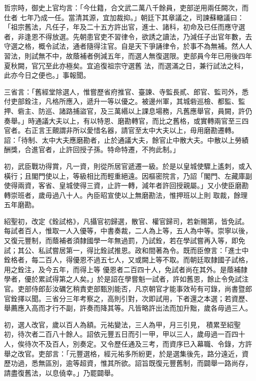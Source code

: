 \begin{pinyinscope}
 哲宗時，御史上官均言：「今仕籍，合文武二萬八千餘員，吏部逆用兩任闕次，而仕者
 七年乃成一任。當清其源，宜加裁抑。」朝廷下其章議之，司諫蘇轍議曰：「祖宗舊法，凡任子，年及二十五方許出官，進士、諸科，初命及已任而應守選者，非逢恩不得放選。先朝患官吏不習律令，欲誘之讀法，乃減任子出官年數，去守選之格，概令試法，通者隨得注官。自是天下爭誦律令，於事不為無補。然人人習法，則試無不中，故蔭補者例減五年，而選人無復選限。吏部員今年已用後四年夏秋闕，官冗至此亦極矣。宜追復祖宗守選舊
 法，而選滿之日，兼行試法之科，此亦今日之便也。」事報聞。



 三省言：「舊經堂除選人，惟嘗歷省府推官、臺諫、寺監長貳、郎官、監司外，悉付吏部銓注，凡格所應入，遞升一等以優之。被邊州軍，其城砦巡檢、都監、監押、砦主、防巡、諸路捕盜官，及三萬緡以上課息場務，凡舊應舉官，員闕，許仍奏舉。」時通議大夫以上，有以特恩、磨勘轉官，而比之舊格，或實轉兩官至三四官者。右正言王覿謂非所以愛惜名器，請官至太中大夫以上，毋用磨勘遷轉。
 詔：「待制、太中大夫應磨勘者，止於通議大夫，餘官止中散大夫。中散以上勞績酬獎，合進官者，止許回授子孫。特命特遷，不拘此制。」



 初，武臣戰功得賞，凡一資，則從所居官遞遷一級。於是以皇城使驟上遙刺，或入橫行；且閣門使以上，等級相比而輕重絕遠。因樞密院言，乃詔「閣門、左藏庫副使得兩資，客省、皇城使得三資，止許一轉，減年者許回授親屬。」又小使臣磨勘轉崇班者，歲毋過八十人。內臣昭宣使以上無磨勘法，惟押班以上則
 取裁，餘理五年磨勘。



 紹聖初，改定《銓試格》，凡攝官初歸選，散官、權官歸司，若新賜第，皆免試。每試者百人，惟取一人入優等，中書奏裁，二人為上等，五人為中等。崇寧以後，又復元豐制，而蔭補者須隸國學一年無過罰，乃試銓，若在學試嘗再入等，即免試；其公、私試嘗居第一，得比銓試推恩。政和間著為令。既而臣僚言：「進士中銓格者，每二百人，得優恩不過五七人，又或闕上等不取。而朝廷取隸國子試格，用之銓注，及今五年，而得上等
 優恩者二百四十人，免試者尚在其外。是蔭補隸學者，優於累試得第之人矣。」於是詔在學嘗魁一試者，許如舊恩，餘止令免試注官。吏部侍郎彭汝礪乞稍責吏部甄別能否，凡京朝官才能事效茍有可錄，尚書暨郎官銓擇以聞。三省分三年考察之，高則引對，次即試用，下者還之本選；若資歷、舉薦應入高而才行不副，許奏而降其等。凡皆略許出法而加升黜，歲各毋過三人。



 初，選人改官，歲以百人為額。元祐變法，三人為甲，月三引見，
 積累至紹聖初，待次者二百八十餘人。詔依元豐五日而引一甲，甲以三人，歲毋過一百四十人，俟待次不及百人，別奏定。又令歷任通及三考，而資序已入幕職、令錄，方許舉之改官。吏部言：「元豐選格，經元祐多所紛更，於是選集後先，路分遠近，資歷功過，悉無區別，逾等超資，惟其所欲。詔旨既復元豐舊制，而闢舉一路尚存，請盡復舊法，以息僥幸。」乃罷闢舉。




\end{pinyinscope}
